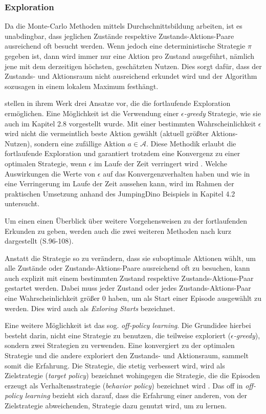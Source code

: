 \subsubsection{Exploration}
Da die Monte-Carlo Methoden mittels Durchschnittsbildung arbeiten, ist es unabdingbar, dass jeglichen Zustände respektive Zustands-Aktions-Paare ausreichend oft besucht werden. Wenn jedoch eine deterministische Strategie $\pi$ gegeben ist, dann wird immer nur eine Aktion pro Zustand ausgeführt, nämlich jene mit dem derzeitigen höchsten, geschätzten Nutzen. Dies sorgt dafür, dass der Zustands- und Aktionsraum nicht ausreichend erkundet wird und der Algorithm sozusagen in einem lokalem Maximum festhängt.
\par 
\cite{Sutton1998} stellen in ihrem Werk drei Ansatze vor, die die fortlaufende Exploration ermöglichen. Eine Möglichkeit ist die Verwendung einer $\epsilon$\textit{-greedy} Strategie, wie sie auch im Kapitel 2.8 vorgestellt wurde. Mit einer bestimmten Wahrscheinlichkeit $\epsilon$ wird nicht die vermeintlich beste Aktion gewählt (aktuell größter  Aktions-Nutzen), sondern eine zufällige Aktion $a \in \mathcal{A}$. Diese Methodik erlaubt die fortlaufende Exploration und garantiert trotzdem eine Konvergenz zu einer optimalen Strategie, wenn $\epsilon$ im Laufe der Zeit verringert wird \cite[S.~201]{Sutton1998}. Welche Auswirkungen die Werte von $\epsilon$ auf das Konvergenzverhalten haben und wie in eine \glqq Verringerung im Laufe der Zeit \grqq{} aussehen kann, wird im Rahmen der praktischen Umsetzung anhand des JumpingDino Beispiels in Kapitel 4.2 untersucht.
\par 
Um einen einen Überblick über weitere Vorgehensweisen zu der fortlaufenden Erkunden zu geben, werden auch die zwei weiteren Methoden nach \cite{Sutton1998} kurz dargestellt (S.96-108). 
\par 
Anstatt die Strategie so zu verändern, dass sie suboptimale Aktionen wählt, um alle Zustände oder Zustands-Aktions-Paare ausreichend oft zu besuchen, kann auch explizit mit einem bestimmten Zustand respektive Zustands-Aktions-Paar gestartet werden. Dabei muss jeder Zustand oder jedes Zustands-Aktions-Paar eine Wahrscheinlichkeit größer 0 haben, um als Start einer Episode ausgewählt zu werden. Dies wird auch als \textit{Exloring Starts} bezeichnet.
\par
Eine weitere Möglichkeit ist das sog. \textit{off-policy learning}. Die Grundidee hierbei besteht darin, nicht eine Strategie zu benutzen, die teilweise exploriert ($\epsilon$\textit{-greedy}), sondern zwei Strategien zu verwenden. Eine konvergiert zu der optimalen Strategie und die andere exploriert den Zustands- und Aktionsraum, sammelt somit die Erfahrung. Die Strategie, die stetig verbessert wird, wird als Zielstrategie (\textit{target policy}) bezeichnet wohingegen die Strategie, die die Episoden erzeugt als Verhaltensstrategie (\textit{behavior policy}) bezeichnet wird \cite[S.~103]{Sutton1998}. Das \glqq off \grqq{} in \textit{off-policy learning} bezieht sich darauf, dass die Erfahrung einer anderen, von der Zielstrategie abweichenden, Strategie dazu genutzt wird, um zu lernen.
\pagebreak
